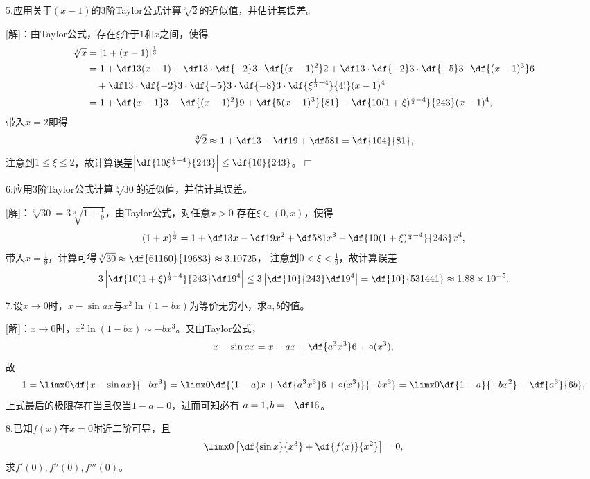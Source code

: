 5.应用关于$(x-1)$的$3$阶Taylor公式计算$\sqrt[3]{2}$的近似值，并估计其误差。

[解]：由Taylor公式，存在$\xi$介于$1$和$x$之间，使得
\begin{align*}
	\sqrt[3]x&=[1+(x-1)]^{\frac13}\\
	&=1+\df13(x-1)
	+\df13\cdot\df{-2}3\cdot\df{(x-1)^2}2
	+\df13\cdot\df{-2}3\cdot\df{-5}3\cdot\df{(x-1)^3}6\\
	&\quad+\df13\cdot\df{-2}3\cdot\df{-5}3\cdot\df{-8}3
	\cdot\df{\xi^{\frac13-4}}{4!}(x-1)^4\\
	&=1+\df{x-1}3-\df{(x-1)^2}9+\df{5(x-1)^3}{81}
	-\df{10(1+\xi)^{\frac13-4}}{243}(x-1)^4,
\end{align*}
带入$x=2$即得
$$\sqrt[3]2\approx1+\df13-\df19+\df5{81}=\df{104}{81},$$
注意到$1\leq\xi\leq 2$，故计算误差$\left|\df{10\xi^{\frac13-4}}{243}\right|
\leq\df{10}{243}$。\hfill$\Box$

\bigskip

6.应用$3$阶Taylor公式计算$\sqrt[3]{30}$的近似值，并估计其误差。

[解]：$\sqrt[3]{30}=3\sqrt[3]{1+\frac19}$，由Taylor公式，对任意$x>0$
存在$\xi\in(0,x)$，使得
$$(1+x)^{\frac13}=1+\df13x-\df19x^2+\df5{81}x^3
-\df{10(1+\xi)^{\frac13-4}}{243}x^4,$$
带入$x=\frac19$，计算可得$\sqrt[3]{30}\approx\df{61160}{19683}\approx
3.10725$，
注意到$0<\xi<\frac19$，故计算误差
$$3\left|\df{10(1+\xi)^{\frac13-4}}{243}
\df1{9^4}\right|\leq3\left|\df{10}{243}\df1{9^4}\right|=\df{10}{531441}
\approx 1.88\times10^{-5}.$$
\fin

\bigskip

7.设$x\to 0$时，$x-\sin ax$与$x^2\ln(1-bx)$为等价无穷小，求$a,b$的值。


[解]：$x\to 0$时，$x^2\ln(1-bx)\sim-bx^3$。又由Taylor公式，
$$x-\sin ax=x-ax+\df{a^3x^3}6+\circ(x^3),$$
故
$$1=\limx0\df{x-\sin ax}{-bx^3}
=\limx0\df{(1-a)x+\df{a^3x^3}6+\circ(x^3)}{-bx^3}
=\limx0\df{1-a}{-bx^2}-\df{a^3}{6b},$$
上式最后的极限存在当且仅当$1-a=0$，进而可知必有
$a=1,b=-\df16$。\fin

\bigskip

8.已知$f(x)$在$x=0$附近二阶可导，且
$$\limx0\left[\df{\sin x}{x^3}+\df{f(x)}{x^2}\right]=0,$$
求$f'(0),f''(0),f'''(0)$。

